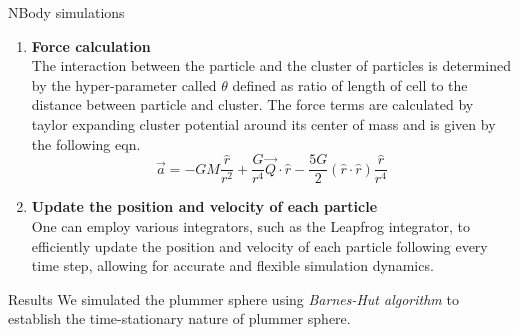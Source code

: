 \documentclass[final]{beamer}
\newlength{\colwidth}
\begin{document}
\begin{frame}[t]
\begin{columns}[t]
\begin{column}{\colwidth}
\begin{block}{NBody simulations}
\begin{enumerate}
\item \textbf{Force calculation} \\
The interaction between the particle and the cluster of particles is determined by the hyper-parameter called $\theta$ defined as ratio of length of cell to the distance between particle and cluster. The force terms are calculated by taylor expanding cluster potential around its center of mass and is given by the following eqn. 
\begin{equation}\label{eq:quadrupole_potential_acceleration}\boxed{
                  \vec{a} = -GM \displaystyle{\frac{\hat{r}}{r^2} + \frac{G}{r^4}\vec{Q}\cdot\hat{r} - \frac{5G}{2}\left(\hat{r}\cdot \hat{r} \right) \frac{\hat{r}}{r^4}}}
\end{equation}
    \item \textbf{Update the position and velocity of each particle} \\
    One can employ various integrators, such as the Leapfrog integrator, to efficiently update the position and velocity of each particle following every time step, allowing for accurate and flexible simulation dynamics.
    
\end{enumerate}

\end{block}

   \begin{block}{Results}
We simulated the plummer sphere using \textit{Barnes-Hut algorithm} to establish the time-stationary nature of plummer sphere.  \\
 \\



\end{block}
\end{column}
\end{columns}
\end{frame}
\end{document}
